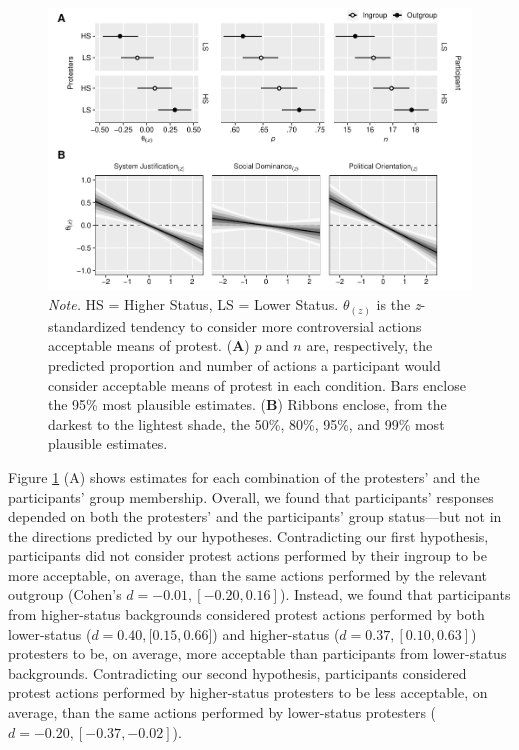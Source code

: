 \documentclass[12pt, letterpaper]{article}
\begin{document}
\begin{figure}[!t]
\centering
\caption{Results from the preregistered (\textbf{A}) and non-preregistered (\textbf{B}) analyses for Experiment 1 without exclusions}
\includegraphics[scale=1]{../Experiment 1/figures/figure-s2}
\caption*{\textit{Note.} HS = Higher Status, LS = Lower Status. $\theta_{(z)}$ is the \textit{z}-standardized tendency to consider more controversial actions acceptable means of protest. (\textbf{A}) $p$ and $n$ are, respectively, the predicted proportion and number of actions a participant would consider acceptable means of protest in each condition. Bars enclose the 95\% most plausible estimates. (\textbf{B}) Ribbons enclose, from the darkest to the lightest shade, the 50\%, 80\%, 95\%, and 99\% most plausible estimates.}
\label{fig:s2}
\end{figure}

Figure \ref{fig:s2} (A) shows estimates for each combination of the
protesters' and the participants' group membership. Overall, we found
that participants' responses depended on both the protesters' and the
participants' group status---but not in the directions predicted by our
hypotheses. Contradicting our first hypothesis, participants did not
consider protest actions performed by their ingroup to be more
acceptable, on average, than the same actions performed by the relevant
outgroup (Cohen's \(d = -0.01, [-0.20, 0.16]\)). Instead, we found that
participants from higher-status backgrounds considered protest actions
performed by both lower-status (\(d = 0.40, [0.15, 0.66\){]}) and
higher-status (\(d = 0.37, [0.10, 0.63]\)) protesters to be, on average,
more acceptable than participants from lower-status backgrounds.
Contradicting our second hypothesis, participants considered protest
actions performed by higher-status protesters to be less acceptable, on
average, than the same actions performed by lower-status protesters
(\(d = -0.20, [-0.37, -0.02]\)).
\end{document}
